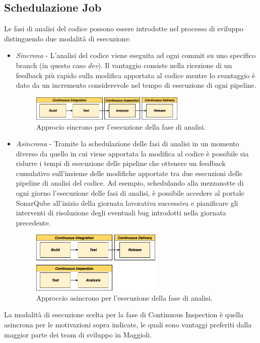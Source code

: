 \subsection{Schedulazione Job}
Le fasi di analisi del codice possono essere introdotte nel processo di sviluppo distinguendo due modalità di esecuzione:
\begin{itemize}
    \item \textit{Sincrona} - L'analisi del codice viene eseguita ad ogni commit su uno specifico branch (in questo caso \textit{dev}). Il vantaggio consiste nella ricezione di un feedback più rapido sulla modifica apportata al codice mentre lo svantaggio è dato da un incremento considerevole nel tempo di esecuzione di ogni pipeline.
    \begin{figure}[H]
    \centering
    \includegraphics[width=0.7\textwidth]{img/tesi-2-30.cicdci.drawio.png}
    \caption{Approcio sincrono per l'esecuzione della fase di analisi.}
    \end{figure}
    \item \textit{Asincrona} - Tramite la schedulazione delle fasi di analisi in un momento diverso da quello in cui viene apportata la modifica al codice è possibile sia ridurre i tempi di esecuzione delle pipeline che ottenere un feedback cumulativo sull'insieme delle modifiche apportate tra due esecuzioni delle pipeline di analisi del codice. Ad esempio, schedulando alla mezzanotte di ogni giorno l'esecuzione delle fasi di analisi, è possibile accedere al portale SonarQube all'inizio della giornata lavorativa successiva e pianificare gli interventi di risoluzione degli eventuali bug introdotti nella giornata precedente.
    \begin{figure}[H]
    \centering
    \includegraphics[width=0.59\textwidth]{img/tesi-2-31-cicdci2.drawio.png}
    \caption{Approccio asincrono per l'esecuzione della fase di analisi.}
    \end{figure}
\end{itemize}
La modalità di esecuzione scelta per la fase di Continuous Inspection è quella asincrona per le motivazioni sopra indicate, le quali sono vantaggi preferiti dalla maggior parte dei team di sviluppo in Maggioli.

